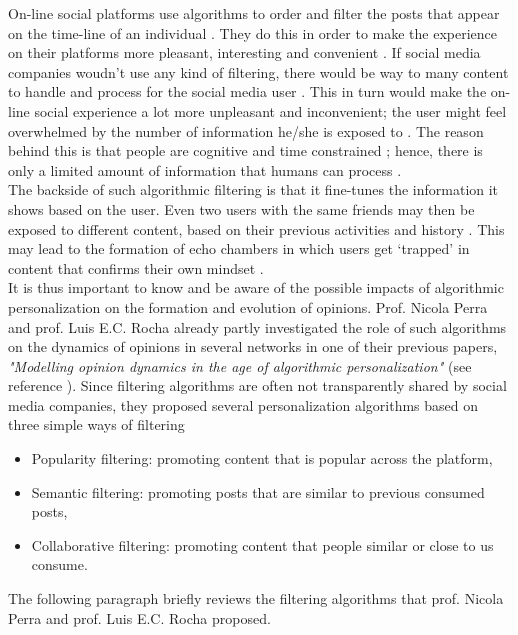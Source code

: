 \documentclass[11 pt , letterpaper , twoside , openright]{book}
\begin{document}
On-line social platforms use algorithms to order and filter the posts that appear on the time-line of an individual \cite{Perra2019}. They do this in order to make the experience on their platforms more pleasant, interesting and convenient \cite{Perra2019}. If social media companies woudn't use any kind of filtering, there would be way to many content to handle and process for the social media user \cite{Bozdag2013}. This in turn would make the on-line social experience a lot more unpleasant and inconvenient; the user might feel overwhelmed by the number of information he/she is exposed to \cite{Bozdag2013}. The reason behind this is that people are cognitive and time constrained \cite{Perra2019}; hence, there is only a limited amount of information that humans can process \cite{Bozdag2013}.\\
\newline
The backside of such algorithmic filtering is that it fine-tunes the information it shows based on the user. Even two users with the same friends may then be exposed to different content, based on their previous activities and history \cite{Bozdag2013}. This may lead to the formation of echo chambers in which users get `trapped' in content that confirms their own mindset \cite{Bozdag2013}. \\
It is thus important to know and be aware of the possible impacts of algorithmic personalization on the formation and evolution of opinions. Prof. Nicola Perra and prof. Luis E.C. Rocha already partly investigated the role of such algorithms on the dynamics of opinions in several networks in one of their previous papers, \textit{"Modelling opinion dynamics in the age of algorithmic personalization"} (see reference \cite{Perra2019}). Since filtering algorithms are often not transparently shared by social media companies, they proposed several personalization algorithms based on three simple ways of filtering \cite{Perra2019}
\begin{itemize}
	\item Popularity filtering: promoting content that is popular across the platform,
	\item Semantic filtering: promoting posts that are similar to previous consumed posts,
	\item Collaborative filtering: promoting content that people similar or close to us consume.
\end{itemize} 
The following paragraph briefly reviews the filtering algorithms that prof. Nicola Perra and prof. Luis E.C. Rocha proposed. \\
\end{document}
